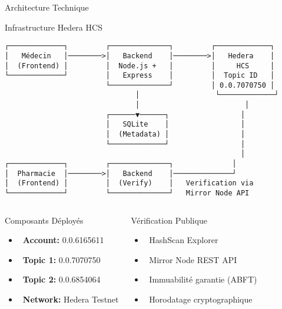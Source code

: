 \documentclass[aspectratio=169,11pt]{beamer}
\begin{document}
\begin{frame}[fragile]{Architecture Technique}

\begin{block}{Infrastructure Hedera HCS}
\tiny
\begin{verbatim}
┌─────────────┐         ┌──────────────┐         ┌─────────────┐
│   Médecin   │────────>│   Backend    │────────>│   Hedera    │
│  (Frontend) │         │  Node.js +   │         │     HCS     │
└─────────────┘         │   Express    │         │  Topic ID   │
                        └──────────────┘         │ 0.0.7070750 │
                               │                  └─────────────┘
                               │                         │
                        ┌──────▼──────┐                 │
                        │   SQLite    │                 │
                        │  (Metadata) │                 │
                        └─────────────┘                 │
                                                        │
┌─────────────┐         ┌──────────────┐              │
│  Pharmacie  │────────>│   Backend    │──────────────┘
│  (Frontend) │         │  (Verify)    │   Verification via
└─────────────┘         └──────────────┘   Mirror Node API
\end{verbatim}
\end{block}

\vspace{0.2cm}

\begin{columns}[T]
\begin{block}{Composants Déployés}
\small
\begin{itemize}
    \item \faUser~\textbf{Account:} 0.0.6165611
    \item \faComments~\textbf{Topic 1:} 0.0.7070750
    \item \faComments~\textbf{Topic 2:} 0.0.6854064
    \item \faNetworkWired~\textbf{Network:} Hedera Testnet
\end{itemize}
\end{block}

\begin{exampleblock}{Vérification Publique}
\small
\begin{itemize}
    \item \faSearch~HashScan Explorer
    \item \faCloud~Mirror Node REST API
    \item \faLock~Immuabilité garantie (ABFT)
    \item \faClock~Horodatage cryptographique
\end{itemize}
\end{exampleblock}
\end{columns}

\end{frame}
\end{document}
